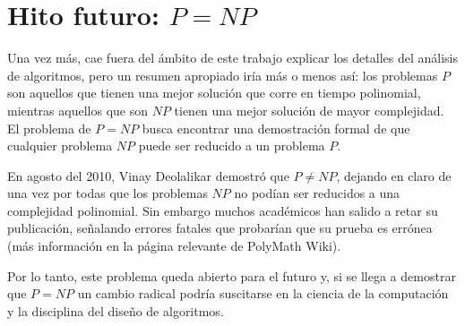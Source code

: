 \documentclass[a4paper,10pt]{article}
\begin{document}
\section{Hito futuro: $P = NP$}

Una vez más, cae fuera del ámbito de este trabajo explicar los detalles del análisis de algoritmos, pero un resumen apropiado iría más o menos así: los problemas $P$ son aquellos que tienen una mejor solución que corre en tiempo polinomial, mientras aquellos que son $NP$ tienen una mejor solución de mayor complejidad. El problema de $P = NP$ busca encontrar una demostración formal de que cualquier problema $NP$ puede ser reducido a un problema $P$.

En agosto del 2010, Vinay Deolalikar demostró que $P \neq NP$, dejando en claro de una vez por todas que los problemas $NP$ no podían ser reducidos a una complejidad polinomial. Sin embargo muchos académicos han salido a retar su publicación, señalando errores fatales que probarían que su prueba es errónea (más información en la página relevante de PolyMath Wiki).

Por lo tanto, este problema queda abierto para el futuro y, si se llega a demostrar que $P = NP$ un cambio radical podría suscitarse en la ciencia de la computación y la disciplina del diseño de algoritmos.
\end{document}
